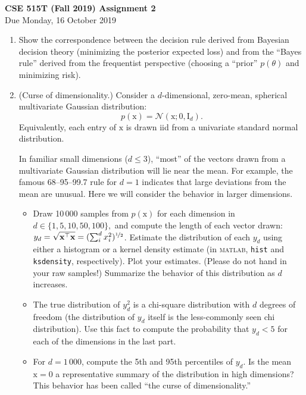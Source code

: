 \documentclass{article}
\newcommand{\acro}[1]{\textsc{\MakeLowercase{#1}}}
\newcommand{\mc}[1]{\mathcal{#1}}
\newcommand{\mat}[1]{\bm{\mathrm{#1}}}
\renewcommand{\vec}[1]{\bm{\mathrm{#1}}}
\newcommand{\trans}{^\top}
\begin{document}
{\large \textbf{CSE 515T (Fall 2019) Assignment 2}} \\
Due Monday, 16 October 2019 \\

\begin{enumerate}

\item
  Show the correspondence between the decision rule derived from
  Bayesian decision theory (minimizing the posterior expected loss)
  and from the ``Bayes rule'' derived from the frequentist perspective
  (choosing a ``prior'' $p(\theta)$ and minimizing risk).

\item
  (Curse of dimensionality.)
  Consider a $d$-dimensional, zero-mean, spherical multivariate
  Gaussian distribution:
  \begin{equation*}
    p(\vec{x}) = \mc{N}(\vec{x}; \vec{0}, \mat{I}_d).
  \end{equation*}
  Equivalently, each entry of $\vec{x}$ is drawn iid from a univariate
  standard normal distribution.

  In familiar small dimensions ($d \leq 3$), ``most'' of the vectors
  drawn from a multivariate Gaussian distribution will lie near the
  mean.  For example, the famous 68--95--99.7 rule for $d = 1$
  indicates that large deviations from the mean are unusual.  Here we
  will consider the behavior in larger dimensions.
  \begin{itemize}
  \item Draw 10\,000 samples from $p(\vec{x})$ for each dimension in
    $d \in \{1, 5, 10, 50, 100\},$ and compute the length of each
    vector drawn: $y_d = \sqrt{\vec{x}\trans \vec{x}} = (\sum_i^d
    x_i^2)^{\nicefrac{1}{2}}$.  Estimate the distribution of each
    $y_d$ using either a histogram or a kernel density estimate (in
    \acro{MATLAB}, \texttt{hist} and \texttt{ksdensity},
    respectively).  Plot your estimates.  (Please do not hand in your
    raw samples!)  Summarize the behavior of this distribution as $d$
    increases.
  \item
    The true distribution of $y_d^2$ is a chi-square distribution with
    $d$ degrees of freedom (the distribution of $y_d$ itself is the
    less-commonly seen chi distribution).  Use this fact to compute
    the probability that $y_d < 5$ for each of the dimensions in the
    last part.
  \item
    For $d = 1\,000$, compute the 5th and 95th percentiles of $y_d$.
    Is the mean $\vec{x} = \vec{0}$ a representative summary of the
    distribution in high dimensions?  This behavior has been called
    ``the curse of dimensionality.''
  \end{itemize}


\end{enumerate}
\end{document}
